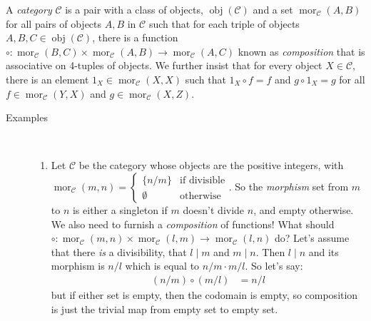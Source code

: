 \documentclass[12pt]{article}
\newcommand{\obj}{\operatorname{obj}}
\newcommand{\mor}{\operatorname{mor}}
\newcommand{\calC}{\mathcal{C}}
\begin{document}
A \emph{category} $\calC$ is a pair with a class of objects,
$\obj(\calC)$ and a set $\mor_\calC(A,B)$ for all pairs of objects
$A,B$ in $\calC$ such that for each triple of objects $A,B,C\in
\obj(\calC)$, there is a function $\circ: \mor_{\calC}(B,C)\times
\mor_\calC(A,B)\rightarrow \mor_\calC(A,C)$ known as
\emph{composition} that is associative on 4-tuples of objects. We
further insist that for every object $X\in \calC$, there is an element
$1_X \in \mor_\calC(X,X)$ such that $1_X\circ f = f$ and $g\circ
1_X=g$ for all $f\in \mor_\calC(Y,X)$ and $g\in \mor_\calC(X,Z)$. 

\begin{description}
\item[Examples]\
  \begin{enumerate}
  \item Let $\calC$ be the category whose objects are the positive
    integers, with $\mor_\calC (m,n)=\begin{cases} \{n/m\} & \textrm{if
        divisible}\\ \emptyset & \textrm{otherwise}\end{cases}$. So
    the \emph{morphism} set from $m$ to $n$ is either a singleton if
    $m$ doesn't divide $n$, and empty otherwise. We also need to
    furnish a \emph{composition} of functions! What should $\circ:
    \mor_\calC(m,n) \times \mor_\calC(l,m)\rightarrow \mor_\calC(l,n)$
    do? Let's assume that there \emph{is} a divisibility, that $l \mid
    m$ and $m\mid n$. Then $l\mid n$ and its morphism is $n/l$ which
    is equal to $n/m \cdot m/l$. So let's say:
    \begin{align*}
      (n/m) \circ (m/l) &= n/l
    \end{align*}
but if either set is empty, then the codomain is empty, so composition
is just the trivial map from empty set to empty set. 


\end{enumerate}
\end{description}
\end{document}
